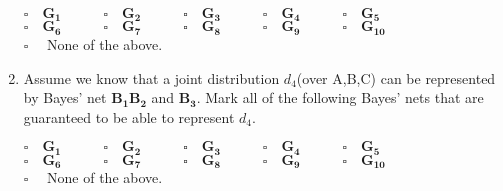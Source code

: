 \documentclass[11pt, answers]{exam}
\begin{document}
\begin{enumerate}
$\square \quad \mathbf{G_1} \quad   \quad \quad \square \quad \mathbf{G_2} \quad \quad \quad \square  \quad\mathbf{G_3} \quad \quad \quad \square \quad \mathbf{G_4} \quad \quad \quad \square  \quad \mathbf{G_5}$\\

$\square \quad \mathbf{G_6} \quad   \quad \quad \square \quad \mathbf{G_7} \quad \quad \quad \square  \quad\mathbf{G_8} \quad \quad \quad \square \quad \mathbf{G_9} \quad \quad \quad \square  \quad \mathbf{G_{10}}$\\

$\square \quad $ None of the above.

\item Assume we know that a joint distribution $d_4$(over A,B,C) can be represented by Bayes' net $\mathbf{B_1} \mathbf{B_2}$ and $\mathbf{B_3}$. Mark all of the following Bayes' nets that are guaranteed to be able to represent $d_4$.

$\square \quad \mathbf{G_1} \quad   \quad \quad \square \quad \mathbf{G_2} \quad \quad \quad \square  \quad\mathbf{G_3} \quad \quad \quad \square \quad \mathbf{G_4} \quad \quad \quad \square  \quad \mathbf{G_5}$\\

$\square \quad \mathbf{G_6} \quad   \quad \quad \square \quad \mathbf{G_7} \quad \quad \quad \square  \quad\mathbf{G_8} \quad \quad \quad \square \quad \mathbf{G_9} \quad \quad \quad \square  \quad \mathbf{G_{10}}$\\

$\square \quad $ None of the above.
\end{enumerate}

\newpage
\end{document}
